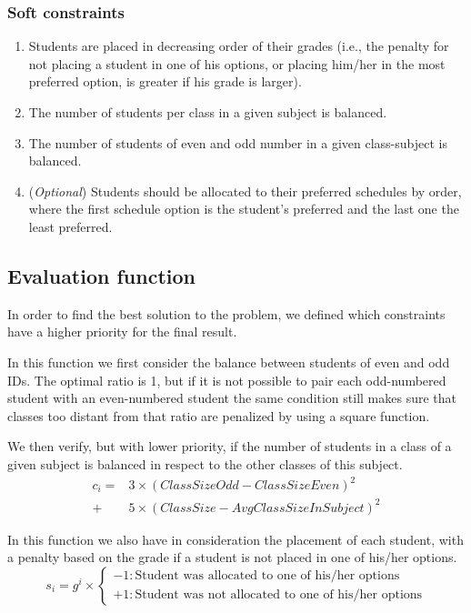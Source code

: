 \documentclass[runningheads]{llncs}
\begin{document}
\subsubsection{Soft constraints}
\begin{enumerate}
    \item Students are placed in decreasing order of their grades (i.e., the penalty for not placing a student in one of his options, or placing him/her in the most preferred option, is greater if his grade is larger).
    \item The number of students per class in a given subject is balanced.
    \item The number of students of even and odd number in a given class-subject is balanced.
    \item (\textit{Optional}) Students should be allocated to their preferred schedules by order, where the first schedule option is the student's preferred and the last one the least preferred.
\end{enumerate}

\subsection{Evaluation function}

In order to find the best solution to the problem, we defined which constraints have a higher priority for the final result.

In this function we first consider the balance between students of even and odd IDs. The optimal ratio is 1, but if it is not possible to pair each odd-numbered student with an even-numbered student the same condition still makes sure that classes too distant from that ratio are penalized by using a square function. 

We then verify, but with lower priority, if the number of students in a class of a given subject is balanced in respect to the other classes of this subject.
\begin{equation}
\begin{aligned}
    c_i = & 3 \times \left(ClassSizeOdd - ClassSizeEven\right)^2 \\
        + & 5 \times \left(ClassSize - AvgClassSizeInSubject\right)^2
\end{aligned}
\end{equation}

In this function we also have in consideration the placement of each student, with a penalty based on the grade if a student is not placed in one of his/her options.
\begin{equation}
    s_i = g^i \times \begin{cases}
        -1 : \text{Student was allocated to one of his/her options} \\
        +1 : \text{Student was not allocated to one of his/her options}
    \end{cases}
\end{equation}
\end{document}
